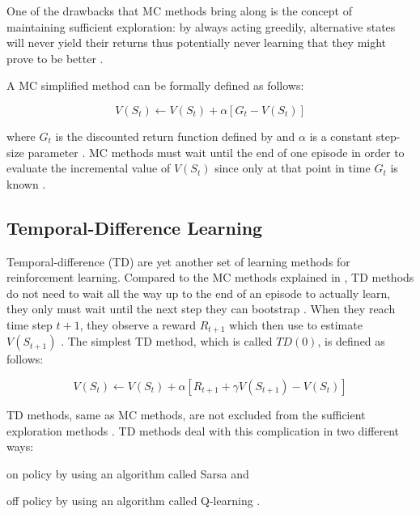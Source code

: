 \documentclass{seal_thesis}
\begin{document}
One of the drawbacks that MC methods bring along is the concept of maintaining sufficient exploration: by always acting greedily, alternative states will never yield their returns thus potentially never learning that they might prove to be better \cite[p. 123]{Sutton2017}.

A MC simplified method can be formally defined as follows:

\begin{equation}
\label{eq:mc_update}
	V(S_t) \leftarrow V(S_t) + \alpha [G_t - V(S_t)]
\end{equation}

where $G_t$ is the discounted return function defined by  and $\alpha$ is a constant step-size parameter \cite[p. 127]{Sutton2017}. MC methods must wait until the end of one episode in order to evaluate the incremental value of $V(S_t)$ since only at that point in time $G_t$ is known \cite[p. 128]{Sutton2017}.

\subsection{Temporal-Difference Learning}
\label{subsec:td_learning}

Temporal-difference (TD) are yet another set of learning methods for reinforcement learning. Compared to the MC methods explained in , TD methods do not need to wait all the way up to the end of an episode to actually learn, they only must wait until the next step \ie they can bootstrap \cite[p. 128]{Sutton2017}. When they reach time step $t+1$, they observe a reward $R_{t+1}$ which then use to estimate $V(S_{t+1})$ \cite[p. 128]{Sutton2017}. The simplest TD method, which is called $TD(0)$, is defined as follows:

\begin{equation}
\label{eq:td_update}
	V(S_t) \leftarrow V(S_t) + \alpha [R_{t+1} + \gamma V(S_{t+1}) - V(S_t)]
\end{equation}

TD methods, same as MC methods, are not  excluded from the sufficient exploration methods \cite[p. 147]{Sutton2017}. TD methods deal with this complication in two different ways:
\begin{enumerate*}
	\item on policy by using an algorithm called Sarsa and
	\item off policy by using an algorithm called Q-learning \cite[p. 128]{Sutton2017}.
\end{enumerate*}
\end{document}
